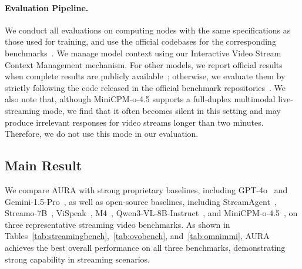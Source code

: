\paragraph{Evaluation Pipeline.}\label{Eval_pipe}

We conduct all evaluations on computing nodes with the same specifications as those used for training, and use the official codebases for the corresponding benchmarks~\citep{lin2024streamingbench,niu2025ovo,wang2025omnimmi}. We manage model context using our Interactive Video Stream Context Management mechanism. For other models, we report official results when complete results are publicly available~\citep{fu2025vispeak, wang2025omnimmi, xia2025streaming, yang2025streamagent}; otherwise, we evaluate them by strictly following the code released in the official benchmark repositories~\citep{minicpmo45,bai2025qwen3}. We also note that, although MiniCPM-o-4.5 supports a full-duplex multimodal live-streaming mode, we find that it often becomes silent in this setting and may produce irrelevant responses for video streams longer than two minutes. Therefore, we do not use this mode in our evaluation.

\subsection{Main Result}


We compare AURA with strong proprietary baselines, including GPT-4o~\citep{hurst2024gpt} and Gemini-1.5-Pro~\citep{team2024gemini}, as well as open-source baselines, including StreamAgent~\citep{yang2025streamagent}, Streamo-7B~\citep{xia2025streaming}, ViSpeak~\citep{fu2025vispeak}, M4~\citep{wang2025omnimmi}, Qwen3-VL-8B-Instruct~\citep{bai2025qwen3}, and MiniCPM-o-4.5~\citep{minicpmo45}, on three representative streaming video benchmarks. As shown in Tables~\ref{tab:streamingbench},~\ref{tab:ovobench}, and~\ref{tab:omnimmi}, AURA achieves the best overall performance on all three benchmarks, demonstrating strong capability in streaming scenarios.

